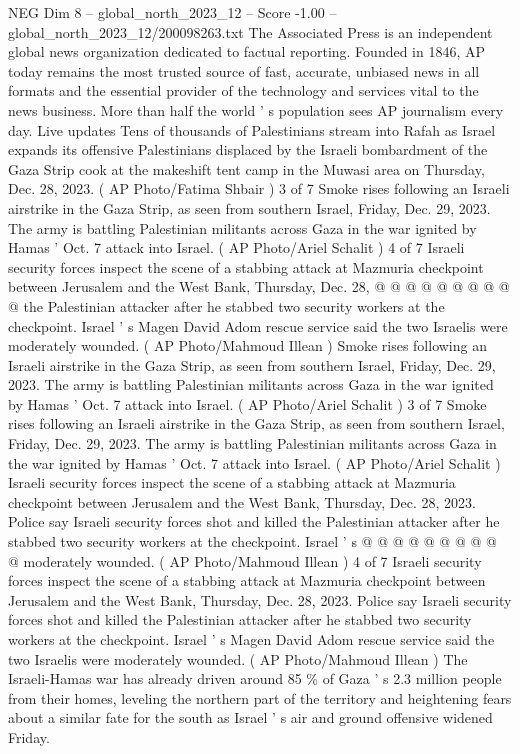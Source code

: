 \begin{textsample}{NEG Dim 8 – global\_north\_2023\_12 – Score -1.00 – global\_north\_2023\_12/200098263.txt}  \label{ex:f8_neg_347}
The Associated Press is an independent global news organization dedicated to factual reporting.
Founded in 1846, AP today remains the most trusted source of fast, accurate, unbiased news in all formats and the essential provider of the technology and services vital to the news business.
More than half the world ' s population sees AP journalism every day.
Live updates Tens of thousands of Palestinians stream into Rafah as Israel expands its offensive Palestinians displaced by the Israeli bombardment of the Gaza Strip cook at the makeshift tent camp in the Muwasi area on Thursday, Dec. 28, 2023. ( AP Photo/Fatima Shbair ) 3 of 7 Smoke rises following an Israeli airstrike in the Gaza Strip, as seen from southern Israel, Friday, Dec. 29, 2023.
The army is battling Palestinian militants across Gaza in the war ignited by Hamas ' Oct. 7 attack into Israel. ( AP Photo/Ariel Schalit ) 4 of 7 Israeli security forces inspect the scene of a stabbing attack at Mazmuria checkpoint between Jerusalem and the West Bank, Thursday, Dec. 28, @ @ @ @ @ @ @ @ @ @ the Palestinian attacker after he stabbed two security workers at the checkpoint.
Israel ' s Magen David Adom rescue service said the two Israelis were moderately wounded. ( AP Photo/Mahmoud Illean ) Smoke rises following an Israeli airstrike in the Gaza Strip, as seen from southern Israel, Friday, Dec. 29, 2023.
The army is battling Palestinian militants across Gaza in the war ignited by Hamas ' Oct. 7 attack into Israel. ( AP Photo/Ariel Schalit ) 3 of 7 Smoke rises following an Israeli airstrike in the Gaza Strip, as seen from southern Israel, Friday, Dec. 29, 2023.
The army is battling Palestinian militants across Gaza in the war ignited by Hamas ' Oct. 7 attack into Israel. ( AP Photo/Ariel Schalit ) Israeli security forces inspect the scene of a stabbing attack at Mazmuria checkpoint between Jerusalem and the West Bank, Thursday, Dec. 28, 2023.
Police say Israeli security forces shot and killed the Palestinian attacker after he stabbed two security workers at the checkpoint.
Israel ' s @ @ @ @ @ @ @ @ @ @ moderately wounded. ( AP Photo/Mahmoud Illean ) 4 of 7 Israeli security forces inspect the scene of a stabbing attack at Mazmuria checkpoint between Jerusalem and the West Bank, Thursday, Dec. 28, 2023.
Police say Israeli security forces shot and killed the Palestinian attacker after he stabbed two security workers at the checkpoint.
Israel ' s Magen David Adom rescue service said the two Israelis were moderately wounded. ( AP Photo/Mahmoud Illean ) The Israeli-Hamas war has already driven around 85 \% of Gaza ' s 2.3 million people from their homes, leveling the northern part of the territory and heightening fears about a similar fate for the south as Israel ' s air and ground offensive widened Friday.

\end{textsample}
